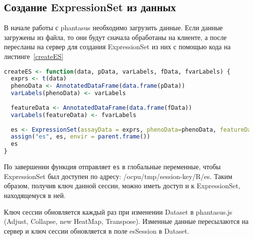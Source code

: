 \documentclass[specification,annotation]{itmo-student-thesis}
\begin{document}
\subsection{Создание ExpressionSet из данных}
В начале работы с phantasus необходимо загрузить данные. Если данные загружены из файла, то они будут сначала обработаны на клиенте, а после пересланы на сервер для создания ExpressionSet из них с помощью кода на листинге~\ref{createES}

\begin{lstlisting}[float=!h,caption={Функция создания ExpressionSet из исходных данных},label={createES},language=R]
createES <- function(data, pData, varLabels, fData, fvarLabels) {
  exprs <- t(data)
  phenoData <- AnnotatedDataFrame(data.frame(pData))
  varLabels(phenoData) <- varLabels
  
  featureData <- AnnotatedDataFrame(data.frame(fData))
  varLabels(featureData) <- fvarLabels
 
  es <- ExpressionSet(assayData = exprs, phenoData=phenoData, featureData = featureData)
  assign("es", es, envir = parent.frame())
  es
}
\end{lstlisting}

По завершении функция отправляет \texttt{es} в глобальные переменные, чтобы ExpressionSet был доступен по адресу: /ocpu/tmp/session-key/R/es. Таким образом, получив ключ данной сессии, можно иметь доступ и к ExpressionSet, находящемуся в ней.

Ключ сессии обновляется каждый раз при изменении Dataset в phantasus.js (Adjust, Collapse, new HeatMap, Transpose). Изменные данные пересылаются на сервер и ключ сессии обновляется в поле esSession в Dataset.
\end{document}
